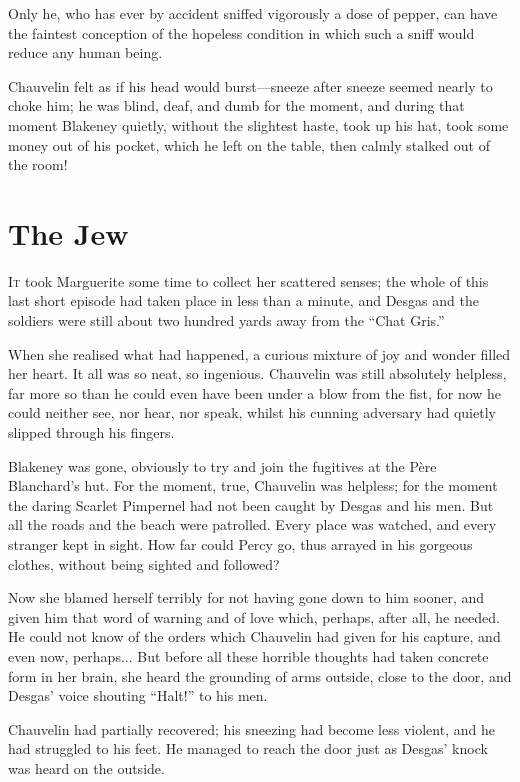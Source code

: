 \documentclass[paper=a5,BCOR=7mm,twoside,DIV=calc,12pt,usegeometry,chapterprefix,endperiod,headings=big]{scrbook}
\begin{document}
Only he, who has ever by accident sniffed vigorously a dose of pepper, can have the faintest conception of the hopeless condition in which such a sniff would reduce any human being.

Chauvelin felt as if his head would burst---sneeze after sneeze seemed nearly to choke him; he was blind, deaf, and dumb for the moment, and during that moment Blakeney quietly, without the slightest haste, took up his hat, took some money out of his pocket, which he left on the table, then calmly stalked out of the room!

\chapter{The Jew}
\lettrine[lines=4]{I}{t} took Marguerite some time to collect her scattered senses; the whole of this last short episode had taken place in less than a minute, and Desgas and the soldiers were still about two hundred yards away from the \enquote{Chat Gris.}

When she realised what had happened, a curious mixture of joy and wonder filled her heart. It all was so neat, so ingenious. Chauvelin was still absolutely helpless, far more so than he could even have been under a blow from the fist, for now he could neither see, nor hear, nor speak, whilst his cunning adversary had quietly slipped through his fingers.

Blakeney was gone, obviously to try and join the fugitives at the Père Blanchard's hut. For the moment, true, Chauvelin was helpless; for the moment the daring Scarlet Pimpernel had not been caught by Desgas and his men. But all the roads and the beach were patrolled. Every place was watched, and every stranger kept in sight. How far could Percy go, thus arrayed in his gorgeous clothes, without being sighted and followed?

Now she blamed herself terribly for not having gone down to him sooner, and given him that word of warning and of love which, perhaps, after all, he needed. He could not know of the orders which Chauvelin had given for his capture, and even now, perhaps... But before all these horrible thoughts had taken concrete form in her brain, she heard the grounding of arms outside, close to the door, and Desgas’ voice shouting \enquote{Halt!} to his men.

Chauvelin had partially recovered; his sneezing had become less violent, and he had struggled to his feet. He managed to reach the door just as Desgas’ knock was heard on the outside.
\end{document}
